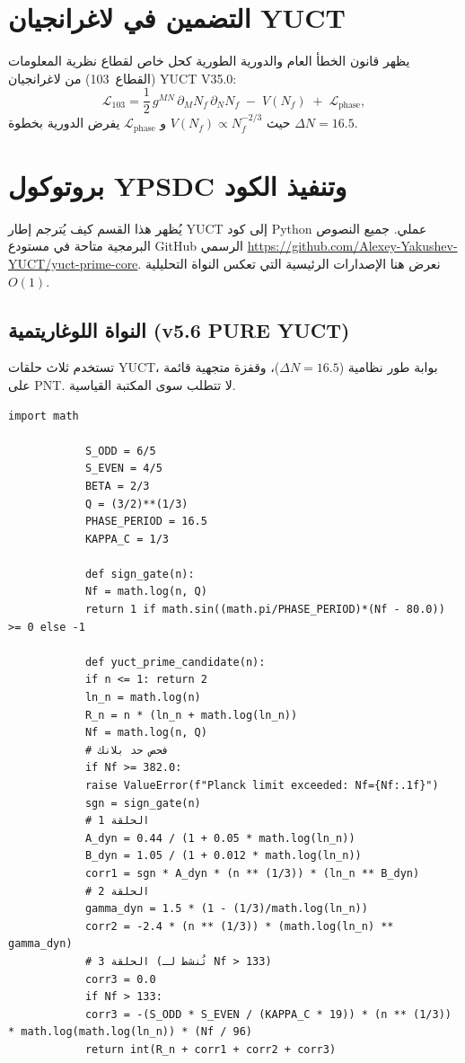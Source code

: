 \documentclass[12pt,a4paper]{article}
\begin{document}
	\section{التضمين في لاغرانجيان YUCT}
	\label{sec:lagrangian-embedding}
	يظهر قانون الخطأ العام والدورية الطورية كحل خاص لقطاع نظرية المعلومات (القطاع~103) من لاغرانجيان YUCT V35.0:
	\begin{equation}\label{eq:L103}
		\mathcal{L}_{103} =
		\frac{1}{2}\,g^{MN}\,\partial_M N_f\,\partial_N N_f
		\;-\; V(N_f)
		\;+\; \mathcal{L}_{\text{phase}},
	\end{equation}
	حيث \(V(N_f) \propto N_f^{-2/3}\) و \(\mathcal{L}_{\text{phase}}\) يفرض الدورية بخطوة \(\Delta N = 16.5\).
	
	\section{بروتوكول YPSDC وتنفيذ الكود}
	\label{sec:ypsdc}
	يُظهر هذا القسم كيف يُترجم إطار YUCT إلى كود Python عملي. جميع النصوص البرمجية متاحة في مستودع GitHub الرسمي \url{https://github.com/Alexey-Yakushev-YUCT/yuct-prime-core}. نعرض هنا الإصدارات الرئيسية التي تعكس النواة التحليلية $O(1)$.
	
	\subsection{النواة اللوغاريتمية (v5.6 PURE YUCT)}
	تستخدم ثلاث حلقات YUCT، بوابة طور نظامية (\(\Delta N=16.5\))، وقفزة متجهية قائمة على PNT. لا تتطلب سوى المكتبة القياسية.
	
	\begin{english}
		\begin{lstlisting}[caption={yuct\_prime.py (v5.6 PURE YUCT)}]
			import math
			
			S_ODD = 6/5
			S_EVEN = 4/5
			BETA = 2/3
			Q = (3/2)**(1/3)
			PHASE_PERIOD = 16.5
			KAPPA_C = 1/3
			
			def sign_gate(n):
			Nf = math.log(n, Q)
			return 1 if math.sin((math.pi/PHASE_PERIOD)*(Nf - 80.0)) >= 0 else -1
			
			def yuct_prime_candidate(n):
			if n <= 1: return 2
			ln_n = math.log(n)
			R_n = n * (ln_n + math.log(ln_n))
			Nf = math.log(n, Q)
			# فحص حد بلانك
			if Nf >= 382.0:
			raise ValueError(f"Planck limit exceeded: Nf={Nf:.1f}")
			sgn = sign_gate(n)
			# الحلقة 1
			A_dyn = 0.44 / (1 + 0.05 * math.log(ln_n))
			B_dyn = 1.05 / (1 + 0.012 * math.log(ln_n))
			corr1 = sgn * A_dyn * (n ** (1/3)) * (ln_n ** B_dyn)
			# الحلقة 2
			gamma_dyn = 1.5 * (1 - (1/3)/math.log(ln_n))
			corr2 = -2.4 * (n ** (1/3)) * (math.log(ln_n) ** gamma_dyn)
			# الحلقة 3 (تُنشط لـ Nf > 133)
			corr3 = 0.0
			if Nf > 133:
			corr3 = -(S_ODD * S_EVEN / (KAPPA_C * 19)) * (n ** (1/3)) * math.log(math.log(ln_n)) * (Nf / 96)
			return int(R_n + corr1 + corr2 + corr3)
		\end{lstlisting}
	\end{english}
	
\end{document}
